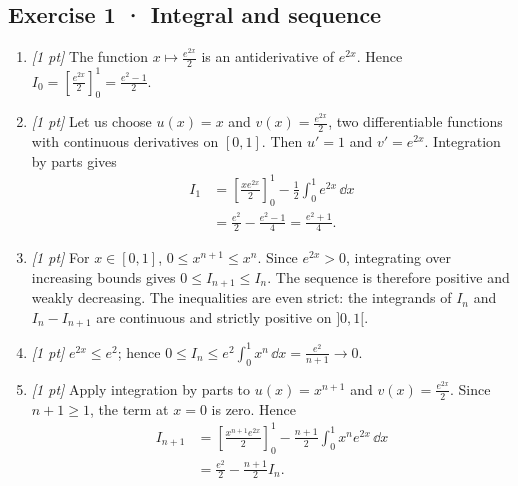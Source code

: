 \subsection*{Exercise 1 · Integral and sequence}\begin{enumerate}

\item \textit{[1 pt]} The function $x\mapsto \frac{e^{2x}}{2}$ is an antiderivative of $e^{2x}$. Hence $I_0=[\frac{e^{2x}}{2}]_0^1=\frac{e^{2}-1}{2}$.

\item \textit{[1 pt]} Let us choose $u(x)=x$ and $v(x)=\frac{e^{2x}}{2}$, two differentiable functions with continuous derivatives on $[0,1]$. Then $u'=1$ and $v'=e^{2x}$. Integration by parts gives
\[\begin{aligned}I_1&=\left[\frac{xe^{2x}}{2}\right]_0^1-\frac{1}{2}\int_0^1e^{2x}\,\dd x\\&=\frac{e^{2}}{2}-\frac{e^{2}-1}{4}=\frac{e^{2}+1}{4}.\end{aligned}\]

\item \textit{[1 pt]} For $x\in[0,1]$, $0\le x^{n+1}\le x^n$. Since $e^{2x}>0$, integrating over increasing bounds gives $0\le I_{n+1}\le I_n$. The sequence is therefore positive and weakly decreasing. The inequalities are even strict: the integrands of $I_n$ and $I_n-I_{n+1}$ are continuous and strictly positive on $]0,1[$.

\item \textit{[1 pt]} $e^{2x}\le e^{2}$; hence $0\le I_n\le e^{2}\int_0^1x^n\,\dd x=\frac{e^{2}}{n+1}\to0$.

\item \textit{[1 pt]} Apply integration by parts to $u(x)=x^{n+1}$ and $v(x)=\frac{e^{2x}}{2}$. Since $n+1\ge1$, the term at $x=0$ is zero. Hence
\[\begin{aligned}I_{n+1}&=\left[\frac{x^{n+1}e^{2x}}{2}\right]_0^1-\frac{n+1}{2}\int_0^1x^ne^{2x}\,\dd x\\&=\frac{e^{2}}{2}-\frac{n+1}{2}I_n.\end{aligned}\]

\end{enumerate}

